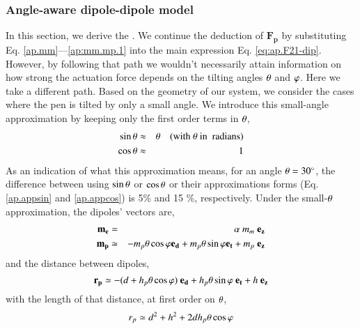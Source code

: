 \subsubsection{Angle-aware dipole-dipole model}
\label{sc:ap.angle-dipole}
    In this section, we derive the .
    We continue the deduction of $\mathbf{F_p}$ by substituting Eq. \ref{ap.mm}---\ref{ap:mm.mp.1} into the main expression Eq. \ref{eq:ap.F21-dip}. However, by following that path we wouldn't necessarily attain information on how strong the actuation force depends on the tilting angles $\theta$ and $\varphi$. Here we take a different path. Based on the geometry of our system, we consider the cases where the pen is tilted by only a small angle. We introduce this small-angle approximation by keeping only the first order terms in $\theta$,
    \begin{eqnarray}
     \stheta &\approx& \angt \ \ \ \ \text{(with} \ \angt \ \text{in \ radians)} \label{ap.appsin} \\
     \ctheta &\approx& 1 \label{ap.appcos}
    \end{eqnarray}
    \noindent As an indication of what this approximation means, for an angle $\theta = 30 ^\circ$, the difference between using $\sin{\theta}$ or $\cos{\theta}$ or their approximations forms (Eq. \ref{ap.appsin} and \ref{ap.appcos}) is 5\% and 15 \%, respectively. Under the small-$\theta$ approximation, the dipoles' vectors are,
    \begin{eqnarray}
     \mathbf{m_e} &=& \alpha \ m_m \ \mathbf{e_z} \label{ap.mm2}\\
     \mathbf{m_p} &\simeq& -m_p \theta \cos{\varphi} \mathbf{e_d} + m_p \theta \sin{\varphi} \mathbf{e_t} + m_p \ \mathbf{e_z} \label{ap.mp2}
    \end{eqnarray}
    \noindent and the distance between dipoles,
    \begin{equation}
    \mathbf{r_{p}} \simeq -(d+h_p \theta \cos{\varphi}) \ \mathbf{e_d} + h_p \theta \sin{\varphi} \ \mathbf{e_t} + h \ \mathbf{e_z}
    \end{equation}
    \noindent with the length of that distance, at first order on $\theta$,
    \begin{equation}
        r_{p} \simeq d^2 + h^2 + 2 d h_p \theta \cos{\varphi} \label{eq:ap.rapp}
    \end{equation}
    
